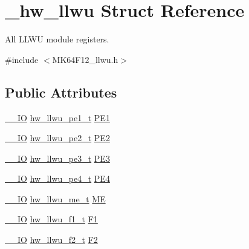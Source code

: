 \hypertarget{struct__hw__llwu}{}\section{\+\_\+hw\+\_\+llwu Struct Reference}
\label{struct__hw__llwu}


All L\+L\+WU module registers.  




{\ttfamily \#include $<$M\+K64\+F12\+\_\+llwu.\+h$>$}

\subsection*{Public Attributes}
\begin{DoxyCompactItemize}
\item 
\hyperlink{core__sc300_8h_aec43007d9998a0a0e01faede4133d6be}{\+\_\+\+\_\+\+IO} \hyperlink{union__hw__llwu__pe1}{hw\+\_\+llwu\+\_\+pe1\+\_\+t} \hyperlink{struct__hw__llwu_a919d3c299fbf9a369c323e66f0baf353}{P\+E1}
\item 
\hyperlink{core__sc300_8h_aec43007d9998a0a0e01faede4133d6be}{\+\_\+\+\_\+\+IO} \hyperlink{union__hw__llwu__pe2}{hw\+\_\+llwu\+\_\+pe2\+\_\+t} \hyperlink{struct__hw__llwu_a6745bd0c612c7272886c21d303d37973}{P\+E2}
\item 
\hyperlink{core__sc300_8h_aec43007d9998a0a0e01faede4133d6be}{\+\_\+\+\_\+\+IO} \hyperlink{union__hw__llwu__pe3}{hw\+\_\+llwu\+\_\+pe3\+\_\+t} \hyperlink{struct__hw__llwu_a0261c5c9bb1706337c4cc90ce2a46282}{P\+E3}
\item 
\hyperlink{core__sc300_8h_aec43007d9998a0a0e01faede4133d6be}{\+\_\+\+\_\+\+IO} \hyperlink{union__hw__llwu__pe4}{hw\+\_\+llwu\+\_\+pe4\+\_\+t} \hyperlink{struct__hw__llwu_a5235d0d009bb58cc911218ca4ee6c6a7}{P\+E4}
\item 
\hyperlink{core__sc300_8h_aec43007d9998a0a0e01faede4133d6be}{\+\_\+\+\_\+\+IO} \hyperlink{union__hw__llwu__me}{hw\+\_\+llwu\+\_\+me\+\_\+t} \hyperlink{struct__hw__llwu_afca5cd2cbba10399297253ca2a5dfd0c}{ME}
\item 
\hyperlink{core__sc300_8h_aec43007d9998a0a0e01faede4133d6be}{\+\_\+\+\_\+\+IO} \hyperlink{union__hw__llwu__f1}{hw\+\_\+llwu\+\_\+f1\+\_\+t} \hyperlink{struct__hw__llwu_a21025fca0fce838798ca5595769de593}{F1}
\item 
\hyperlink{core__sc300_8h_aec43007d9998a0a0e01faede4133d6be}{\+\_\+\+\_\+\+IO} \hyperlink{union__hw__llwu__f2}{hw\+\_\+llwu\+\_\+f2\+\_\+t} \hyperlink{struct__hw__llwu_ab16169cedbd4f447c4e970b57db3991c}{F2}

\end{DoxyCompactItemize}

